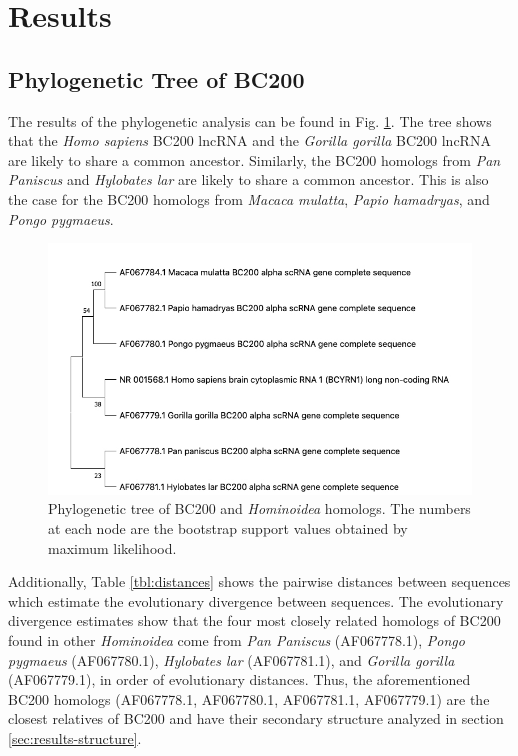 \documentclass[conference, 11pt]{IEEEtran}
\begin{document}
\section{Results}\label{sec:results}

\subsection{Phylogenetic Tree of BC200}

The results of the phylogenetic analysis can be found in Fig. \ref{fig:phylo-tree}. 
The tree shows that the \emph{Homo sapiens} BC200 lncRNA and the \emph{Gorilla gorilla} BC200 lncRNA are likely to share a common ancestor. 
Similarly, the BC200 homologs from \emph{Pan Paniscus} and \emph{Hylobates lar} are likely to share a common ancestor. 
This is also the case for the BC200 homologs from \emph{Macaca mulatta}, \emph{Papio hamadryas}, and \emph{Pongo pygmaeus}. 

\begin{figure}[ht]
  \centering
  \includegraphics[width=\columnwidth, keepaspectratio]{figs/phylogenetic-tree.jpg}
  \caption{Phylogenetic tree of BC200 and \emph{Hominoidea} homologs. The numbers at each node are the bootstrap support values obtained by maximum likelihood.}
  \label{fig:phylo-tree}
\end{figure}

Additionally, Table \ref{tbl:distances} shows the pairwise distances between sequences which estimate the evolutionary divergence between sequences. 
The evolutionary divergence estimates show that the four most closely related homologs of BC200 found in other \emph{Hominoidea} come from \emph{Pan Paniscus} (AF067778.1), \emph{Pongo pygmaeus} (AF067780.1), \emph{Hylobates lar} (AF067781.1), and \emph{Gorilla gorilla} (AF067779.1), in order of evolutionary distances. 
Thus, the aforementioned BC200 homologs (AF067778.1, AF067780.1, AF067781.1, AF067779.1) are the closest relatives of BC200 and have their secondary structure analyzed in section \ref{sec:results-structure}.
\end{document}
